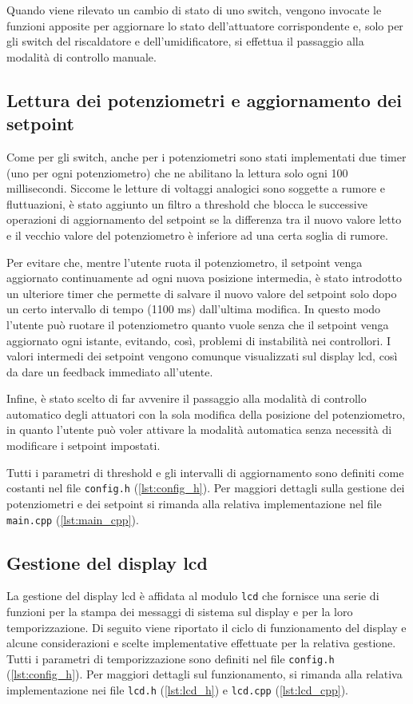Quando viene rilevato un cambio di stato di uno switch, vengono invocate le funzioni apposite per aggiornare lo stato
dell'attuatore corrispondente e, solo per gli switch del riscaldatore e dell'umidificatore, si effettua il passaggio
alla modalità di controllo manuale.

\subsection{Lettura dei potenziometri e aggiornamento dei setpoint}
Come per gli switch, anche per i potenziometri sono stati implementati due timer (uno per ogni potenziometro) che ne abilitano
la lettura solo ogni 100 millisecondi. Siccome le letture di voltaggi analogici sono soggette a rumore e fluttuazioni, è stato
aggiunto un filtro a threshold che blocca le successive operazioni di aggiornamento del setpoint se la differenza tra il nuovo
valore letto e il vecchio valore del potenziometro è inferiore ad una certa soglia di rumore.

Per evitare che, mentre l'utente ruota il potenziometro, il setpoint venga aggiornato continuamente ad ogni nuova posizione
intermedia, è stato introdotto un ulteriore timer che permette di salvare il nuovo valore del setpoint solo dopo un certo
intervallo di tempo (1100 ms) dall'ultima modifica. In questo modo l'utente può ruotare il potenziometro quanto vuole senza
che il setpoint venga aggiornato ogni istante, evitando, così, problemi di instabilità nei controllori. I valori intermedi
dei setpoint vengono comunque visualizzati sul display lcd, così da dare un feedback immediato all'utente.

Infine, è stato scelto di far avvenire il passaggio alla modalità di controllo automatico degli attuatori con la sola modifica
della posizione del potenziometro, in quanto l'utente può voler attivare la modalità automatica senza necessità di modificare
i setpoint impostati.

Tutti i parametri di threshold e gli intervalli di aggiornamento sono definiti come costanti nel file \verb|config.h|
(\autoref{lst:config_h}). Per maggiori dettagli sulla gestione dei potenziometri e dei setpoint si rimanda alla relativa
implementazione nel file \verb|main.cpp| (\autoref{lst:main_cpp}).

\subsection{Gestione del display lcd}
La gestione del display lcd è affidata al modulo \verb|lcd| che fornisce una serie di funzioni per la stampa dei messaggi di
sistema sul display e per la loro temporizzazione. Di seguito viene riportato il ciclo di funzionamento del display e alcune
considerazioni e scelte implementative effettuate per la relativa gestione. Tutti i parametri di temporizzazione sono definiti
nel file \verb|config.h| (\autoref{lst:config_h}). Per maggiori dettagli sul funzionamento, si rimanda alla relativa
implementazione nei file \verb|lcd.h| (\autoref{lst:lcd_h}) e \verb|lcd.cpp| (\autoref{lst:lcd_cpp}).

